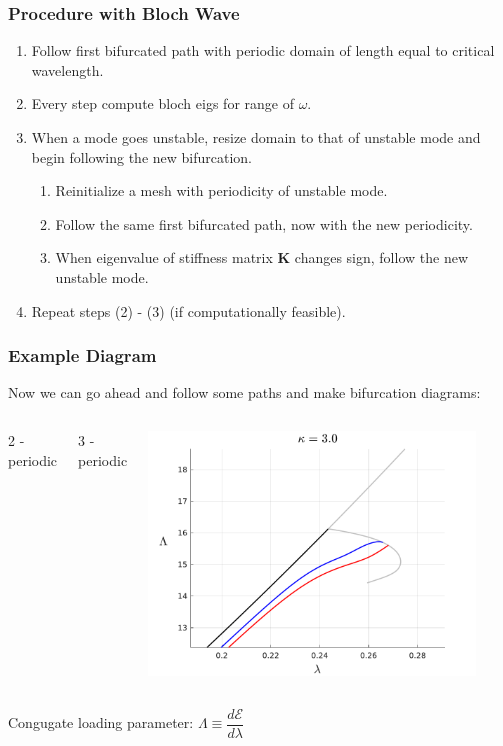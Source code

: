 \documentclass{beamer}
\begin{document}
\begin{frame}
	\frametitle{\large Procedure with Bloch Wave}
	
	\begin{enumerate}
		\item Follow first bifurcated path with periodic domain of length equal to critical wavelength.
		\item Every step compute bloch eigs for range of $\omega$.
		\item When a mode goes unstable, resize domain to that of unstable mode and begin following the new bifurcation.
		\begin{enumerate}
		
		\item Reinitialize a mesh with periodicity of unstable mode.
		\item Follow the same first bifurcated path,  now with the new periodicity.
		\item When eigenvalue of stiffness matrix $\mathbf{K}$ changes sign, follow the new unstable mode.
		\end{enumerate}

		\item Repeat steps (2) - (3) (if computationally feasible). 
	\end{enumerate}
\end{frame}


\begin{frame}
	\frametitle{\large Example Diagram}
	
	Now we can go ahead and follow some paths and make bifurcation diagrams:
	\begin{columns}
			\color{red} 2 - periodic
			
			\color{blue} 3 - periodic
			
		\begin{center}
			\includegraphics[width = 0.9\textwidth]{myFigures/bif_diagram_exp_3_0}
		\end{center}	
	\end{columns}

\vspace{0.05 in}	
	\color{black}
	Congugate loading parameter: $\Lambda \equiv \dfrac{d\mathcal{E}}{d\lambda}$
\end{frame}
\end{document}
